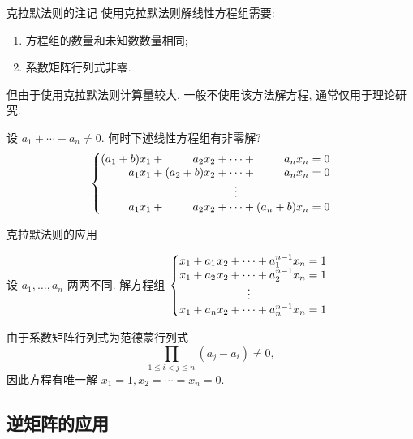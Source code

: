 \begin{frame}{克拉默法则的注记}
	\onslide<+->
	使用克拉默法则解线性方程组需要:
	\begin{enumerate}
		\item 方程组的数量和未知数数量相同;
		\item 系数矩阵行列式非零.
	\end{enumerate}
	\onslide<+->
	但由于使用克拉默法则计算量较大, 一般不使用该方法解方程, 通常仅用于理论研究.

	\onslide<+->
	\begin{exercise}
		设 $a_1+\cdots+a_n\neq 0$.
		何时下述线性方程组有非零解? \visible<+->{\alert{$b=0$.}}
		\[\laeq[rcrccrc]{
			(a_1+b)&x_1+{}&a_2&x_2&{}+\cdots+{}&a_n&x_n=0\\
			a_1&x_1+{}&(a_2+b)&x_2&{}+\cdots+{}&a_n&x_n=0\\
			&&&&\vdots&&\\
			a_1&x_1+{}&a_2&x_2&{}+\cdots+{}&(a_n+b)&x_n=0}\]
	\end{exercise}
\end{frame}


\begin{frame}{克拉默法则的应用}
	\onslide<+->
	\begin{exercise}
		设 $a_1,\dots,a_n$ 两两不同.
		解方程组 $\laeq[clcclc]{
			x_1+{}&a_1&x_2&{}+\cdots+{}&a_1^{n-1}&x_n=1\\
			x_1+{}&a_2&x_2&{}+\cdots+{}&a_2^{n-1}&x_n=1\\
			&&&\vvdots&&\\
			x_1+{}&a_n&x_2&{}+\cdots+{}&a_n^{n-1}&x_n=1}$
	\end{exercise}
	\onslide<+->
	\begin{answer}
		由于系数矩阵行列式为范德蒙行列式
		\[\prod_{1\le i<j\le n}(a_j-a_i)\neq0,\]
		因此方程有唯一解 $x_1=1,x_2=\cdots=x_n=0$.
	\end{answer}
\end{frame}




\subsection{逆矩阵的应用}

